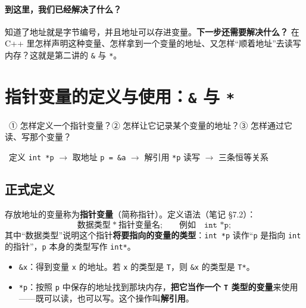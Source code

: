 \documentclass[UTF8,a4paper,11pt,fontset=none,zihao=-4]{ctexart}
\newcommand{\ci}[1]{{\circfont #1}}
\newcommand{\cc}[1]{\texttt{#1}}
\begin{document}
\paragraph{到这里，我们已经解决了什么？} 知道了地址就是字节编号，并且地址可以存进变量。\textbf{下一步还需要解决什么？} 在 C++ 里怎样声明这种变量、怎样拿到一个变量的地址、又怎样“顺着地址”去读写内存？这就是第二讲的 \cc{\&} 与 \cc{*}。

\section{\texorpdfstring{指针变量的定义与使用：\texttt{\&} 与 \texttt{*}}{指针变量的定义与使用：& 与 *}}\label{sec:def}
\ \ci{①} 怎样定义一个指针变量？\ci{②} 怎样让它记录某个变量的地址？\ci{③} 怎样通过它读、写那个变量？\par
{}\ 定义 \cc{int *p} $\to$ 取地址 \cc{p = \&a} $\to$ 解引用 \cc{*p} 读写 $\to$ 三条恒等关系

\subsection{正式定义}
\begin{definitionbox}[指针变量]
存放地址的变量称为\textbf{指针变量}（简称指针）。定义语法（笔记 §7.2）：
\[
\text{数据类型}\ \texttt{*}\ \text{指针变量名};\qquad\text{例如}\quad \texttt{int *p;}
\]
其中“数据类型”说明这个指针\textbf{将要指向的变量的类型}：\cc{int *p} 读作“\cc{p} 是指向 \cc{int} 的指针”，\cc{p} 本身的类型写作 \cc{int*}。
\end{definitionbox}

\begin{definitionbox}
\begin{itemize}[leftmargin=1.5em]
  \item \cc{\&x}：得到变量 \cc{x} 的地址。若 \cc{x} 的类型是 \cc{T}，则 \cc{\&x} 的类型是 \cc{T*}。
  \item \cc{*p}：按照 \cc{p} 中保存的地址找到那块内存，\textbf{把它当作一个 \cc{T} 类型的变量}来使用——既可以读，也可以写。这个操作叫\textbf{解引用}。
\end{itemize}
\end{definitionbox}
\end{document}
